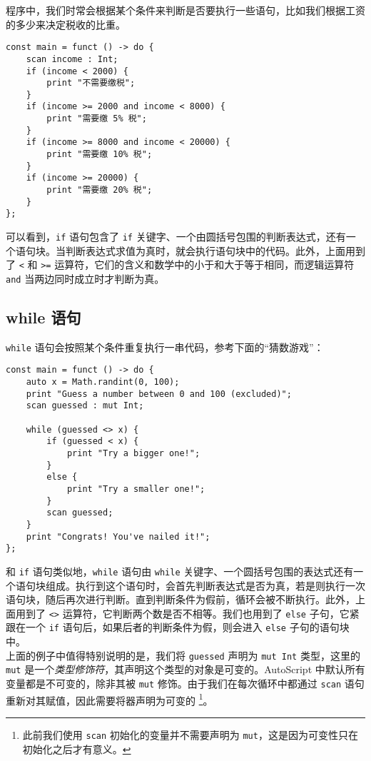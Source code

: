 程序中，我们时常会根据某个条件来判断是否要执行一些语句，比如我们根据工资的多少来决定税收的比重。

\begin{lstlisting}
const main = funct () -> do {
    scan income : Int;
    if (income < 2000) {
        print "不需要缴税";
    }
    if (income >= 2000 and income < 8000) {
        print "需要缴 5% 税";
    }
    if (income >= 8000 and income < 20000) {
        print "需要缴 10% 税";
    }
    if (income >= 20000) {
        print "需要缴 20% 税";
    }
};
\end{lstlisting}

可以看到，\lstinline!if! 语句包含了 \lstinline!if! 关键字、一个由圆括号包围的判断表达式，还有一个语句块。当判断表达式求值为真时，就会执行语句块中的代码。此外，上面用到了 \lstinline!<! 和 \lstinline!>=! 运算符，它们的含义和数学中的小于和大于等于相同，而逻辑运算符 \lstinline!and! 当两边同时成立时才判断为真。


\subsection{while 语句}

\lstinline!while! 语句会按照某个条件重复执行一串代码，参考下面的“猜数游戏”：

\begin{lstlisting}
const main = funct () -> do {
    auto x = Math.randint(0, 100);
    print "Guess a number between 0 and 100 (excluded)";
    scan guessed : mut Int;

    while (guessed <> x) {
        if (guessed < x) {
            print "Try a bigger one!";
        }
        else {
            print "Try a smaller one!";
        }
        scan guessed;
    }
    print "Congrats! You've nailed it!";
};
\end{lstlisting}

和 \lstinline!if! 语句类似地，\lstinline!while! 语句由 \lstinline!while! 关键字、一个圆括号包围的表达式还有一个语句块组成。执行到这个语句时，会首先判断表达式是否为真，若是则执行一次语句块，随后再次进行判断。直到判断条件为假前，循环会被不断执行。此外，上面用到了 \lstinline!<>! 运算符，它判断两个数是否不相等。我们也用到了 \lstinline!else! 子句，它紧跟在一个 \lstinline!if! 语句后，如果后者的判断条件为假，则会进入 \lstinline!else! 子句的语句块中。 \\

上面的例子中值得特别说明的是，我们将 \lstinline!guessed! 声明为 \lstinline!mut Int! 类型，这里的 \lstinline!mut! 是一个\emph{类型修饰符}，其声明这个类型的对象是可变的。AutoScript 中默认所有变量都是不可变的，除非其被 \lstinline!mut! 修饰。由于我们在每次循环中都通过 \lstinline!scan! 语句重新对其赋值，因此需要将器声明为可变的 \footnote{此前我们使用 \lstinline!scan! 初始化的变量并不需要声明为 \lstinline!mut!，这是因为可变性只在初始化之后才有意义。}。

